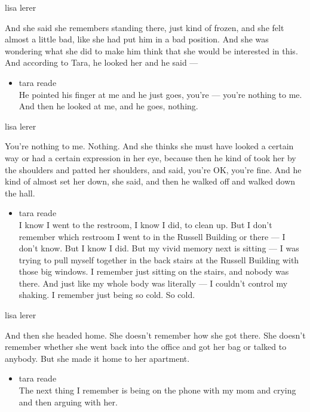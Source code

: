 lisa lerer

And she said she remembers standing there, just kind of frozen, and she
felt almost a little bad, like she had put him in a bad position. And
she was wondering what she did to make him think that she would be
interested in this. And according to Tara, he looked her and he said ---

\begin{itemize}
\tightlist
\item
  tara reade\\
  He pointed his finger at me and he just goes, you're --- you're
  nothing to me. And then he looked at me, and he goes, nothing.
\end{itemize}

lisa lerer

You're nothing to me. Nothing. And she thinks she must have looked a
certain way or had a certain expression in her eye, because then he kind
of took her by the shoulders and patted her shoulders, and said, you're
OK, you're fine. And he kind of almost set her down, she said, and then
he walked off and walked down the hall.

\begin{itemize}
\tightlist
\item
  tara reade\\
  I know I went to the restroom, I know I did, to clean up. But I don't
  remember which restroom I went to in the Russell Building or there ---
  I don't know. But I know I did. But my vivid memory next is sitting
  --- I was trying to pull myself together in the back stairs at the
  Russell Building with those big windows. I remember just sitting on
  the stairs, and nobody was there. And just like my whole body was
  literally --- I couldn't control my shaking. I remember just being so
  cold. So cold.
\end{itemize}

lisa lerer

And then she headed home. She doesn't remember how she got there. She
doesn't remember whether she went back into the office and got her bag
or talked to anybody. But she made it home to her apartment.

\begin{itemize}
\tightlist
\item
  tara reade\\
  The next thing I remember is being on the phone with my mom and crying
  and then arguing with her.
\end{itemize}

